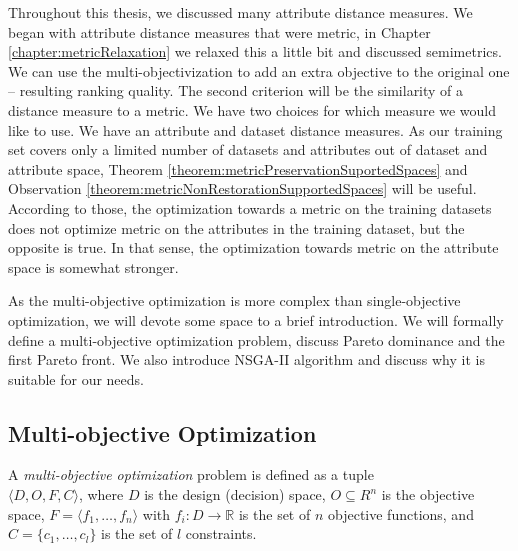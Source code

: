 Throughout this thesis, we discussed many attribute distance measures. We began with attribute distance measures that were metric, in Chapter \ref{chapter:metricRelaxation} we relaxed this a little bit and discussed semimetrics. We can use the multi-objectivization to add an extra objective to the original one -- resulting ranking quality. The second criterion will be the similarity of a distance measure to a metric. We have two choices for which measure we would like to use. We have an attribute and dataset distance measures. As our training set covers only a limited number of datasets and attributes out of dataset and attribute space, Theorem \ref{theorem:metricPreservationSuportedSpaces} and Observation \ref{theorem:metricNonRestorationSupportedSpaces} will be useful. According to those, the optimization towards a metric on the training datasets does not optimize metric on the attributes in the training dataset, but the opposite is true. In that sense, the optimization towards metric on the attribute space is somewhat stronger. 

As the multi-objective optimization is more complex than single-objective optimization, we will devote some space to a brief introduction. We will formally define a multi-objective optimization problem, discuss Pareto dominance and the first Pareto front. We also introduce NSGA-II algorithm and discuss why it is suitable for our needs.

\subsection{Multi-objective Optimization}
\begin{definition}
	A \emph{multi-objective optimization} problem is defined as a
	tuple \\ $\langle D, O, F, C \rangle$, where $D$ is the design (decision) space, $O \subseteq R^n$ is
	the objective space, $F = \langle  f_1, \dots , f_n \rangle$ with $f_i: D \rightarrow \mathbb{R}$ is the set of $n$ objective functions, and $C = \lbrace c_1, \dots, c_l \rbrace$ is the set of $l$ constraints.
\end{definition}

